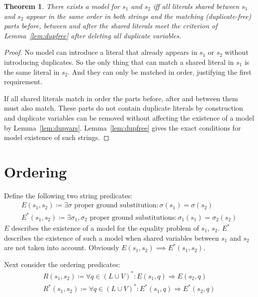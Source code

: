 \documentclass[a4paper, 12pt]{article}
\newcommand{\shortimplies}{\Rightarrow}
\newtheorem{theorem}{Theorem}
\begin{document}
\begin{theorem}\label{thm:modelext}
There exists a model for $s_1$ and $s_2$ iff all literals shared between $s_1$ and $s_2$ appear in the same order in both strings and the matching (duplicate-free) parts before, between and after the shared literals meet the criterion of Lemma~\ref{lem:dupfree} after deleting all duplicate variables.
\end{theorem}
\begin{proof}
No model can introduce a literal that already appears in $s_1$ or $s_2$ without introducing duplicates. So the only thing that can match a shared literal in $s_1$ is the same literal in $s_2$.
And they can only be matched in order, justifying the first requirement.

If all shared literals match in order the parts before, after and between them must also match. These parts do not contain duplicate literals by construction and duplicate variables can be removed without affecting the existence of a model by Lemma~\ref{lem:dupvars}. Lemma~\ref{lem:dupfree} gives the exact conditions for model existence of such strings.
\end{proof}

\section{Ordering}\label{sec:ordering}

Define the following two string predicates:
\begin{gather*}
E(s_1, s_2) \coloneqq \exists \sigma \text{ proper ground substitution}: \sigma(s_1) = \sigma(s_2)
\\
E^*(s_1, s_2) \coloneqq \exists \sigma_1, \sigma_2 \text{ proper ground substitutions}: \sigma_1(s_1) = \sigma_2(s_2)
\end{gather*}
$E$ describes the existence of a model for the equality problem of $s_1$, $s_2$. $E^*$ describes the existence of such a model when shared variables between $s_1$ and $s_2$ are not taken into account. Obviously $E(s_1, s_2) \implies E^*(s_1, s_2)$.

Next consider the ordering predicates:
\begin{gather*}
R(s_1, s_2) \coloneqq \forall q \in (L \cup V)^*: E(s_1, q) \shortimplies E(s_2, q)
\\
R^*(s_1, s_2) \coloneqq \forall q \in (L \cup V)^*: E^*(s_1, q) \shortimplies E^*(s_2, q)
\end{gather*}
\end{document}

